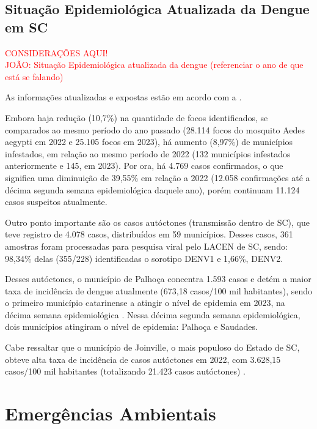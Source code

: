\subsection{Situação Epidemiológica Atualizada da Dengue em \acrlong{SC}}

\begin{center}
\textcolor{red}{CONSIDERAÇÕES AQUI!}\\
\indent \textcolor{red}{JOÃO: Situação Epidemiológica atualizada da dengue (referenciar o ano de que está se falando)}\\
\end{center}

\indent As informações atualizadas e expostas estão em acordo com a .

\indent Embora haja redução (10,7\%) na quantidade de focos identificados, se comparados ao mesmo período do ano passado (28.114 focos do mosquito Aedes aegypti em 2022 e 25.105 focos em 2023), há aumento (8,97\%) de municípios infestados, em relação ao mesmo período de 2022 (132 municípios infestados anteriormente e 145, em 2023). Por ora, há 4.769 casos confirmados, o que significa uma diminuição de 39,55\% em relação a 2022 (12.058 confirmações até a décima segunda semana epidemiológica daquele ano), porém continuam 11.124 casos suspeitos atualmente.

\indent Outro ponto importante são os casos autóctones (transmissão dentro de \acrlong{SC}), que teve registro de 4.078 casos, distribuídos em 59 municípios. Desses casos, 361 amostras foram processadas para pesquisa viral pelo \acrfull{LACEN} de \acrlong{SC}, sendo: 98,34\% delas (355/228) identificadas o sorotipo DENV1 e 1,66\%, DENV2.

\indent Desses autóctones, o município de Palhoça concentra 1.593 casos e detém a maior taxa de incidência de dengue atualmente (673,18 casos/100 mil habitantes), sendo o primeiro município catarinense a atingir o nível de epidemia em 2023, na décima semana epidemiológica \cite{Informe6DiveSE10/23}. Nessa décima segunda semana epidemiológica, dois municípios atingiram o nível de epidemia: Palhoça e Saudades.

\indent Cabe ressaltar que o município de Joinville, o mais populoso do Estado de \acrlong{SC}, obteve alta taxa de incidência de casos autóctones em 2022, com 3.628,15 casos/100 mil habitantes (totalizando 21.423 casos autóctones) \cite{Informe31DiveSE52/22}.

\section{Emergências Ambientais}

